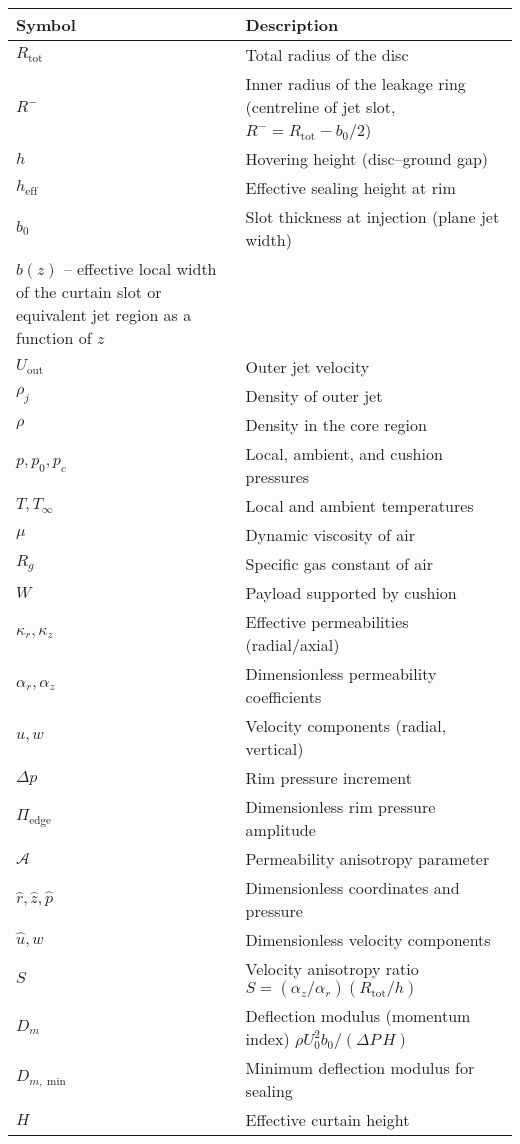 \documentclass[11pt,a4paper]{article}
\begin{document}
\begin{tabular}{@{}ll@{}}
\toprule
Symbol & Description \\ \midrule
$R_{\mathrm{tot}}$ & Total radius of the disc \\
$R^{-}$ & Inner radius of the leakage ring (centreline of jet slot, $R^{-}=R_{\mathrm{tot}}-b_0/2$) \\
$h$ & Hovering height (disc--ground gap) \\
$h_{\mathrm{eff}}$ & Effective sealing height at rim \\
$b_0$ & Slot thickness at injection (plane jet width) \\
$b(z)$ -- effective local width of the curtain slot or equivalent jet region as a function of $z$ \\
$U_{\mathrm{out}}$ & Outer jet velocity \\
$\rho_j$ & Density of outer jet \\
$\rho$ & Density in the core region \\
$p,p_0,p_c$ & Local, ambient, and cushion pressures \\
$T,T_\infty$ & Local and ambient temperatures \\
$\mu$ & Dynamic viscosity of air \\
$R_g$ & Specific gas constant of air \\
$W$ & Payload supported by cushion \\
$\kappa_r,\kappa_z$ & Effective permeabilities (radial/axial) \\
$\alpha_r,\alpha_z$ & Dimensionless permeability coefficients \\
$u,w$ & Velocity components (radial, vertical) \\
$\Delta p$ & Rim pressure increment \\
$\Pi_{\mathrm{edge}}$ & Dimensionless rim pressure amplitude \\
$\mathcal{A}$ & Permeability anisotropy parameter \\
$\hat r,\hat z,\hat p$ & Dimensionless coordinates and pressure \\
$\hat u,\hat w$ & Dimensionless velocity components \\
$S$ & Velocity anisotropy ratio $S=(\alpha_z/\alpha_r)(R_{\mathrm{tot}}/h)$ \\ $D_m$ & Deflection modulus (momentum index) $\rho U_0^2 b_0/(\Delta P\,H)$ \\
$D_{m,\min}$ & Minimum deflection modulus for sealing \\
$H$ & Effective curtain height \\

\end{tabular}
\end{document}
